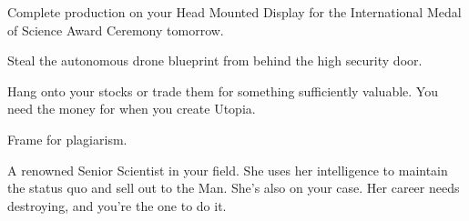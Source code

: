 \documentclass[char]{guildcamp1}
\begin{document}
\begin{itemz}[Goals]
\item Complete production on your Head Mounted Display for the International Medal of Science Award Ceremony tomorrow.
\item Steal the autonomous drone blueprint from behind the high security door.
\item Hang onto your stocks or trade them for something sufficiently valuable. You need the money for when you create Utopia.
\item Frame \cScientist{} for plagiarism.
\end{itemz}




\begin{contacts}
  \contact{\cScientist{}} A renowned Senior Scientist in your field. She uses her intelligence to maintain the status quo and sell out to the Man. She's also on your case. Her career needs destroying, and you're the one to do it.
\end{contacts}
\end{document}
